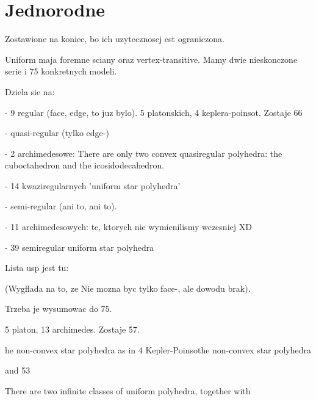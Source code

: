 \section{Jednorodne}
Zostawione na koniec, bo ich uzytecznoscj est ograniczona.

Uniform maja foremne sciany oraz vertex-transitive. Mamy dwie nieskonczone serie i 75 konkretnych modeli.

Dziela sie na:

- 9 regular (face, edge, to juz bylo). 5 platonskich, 4 keplera-poinsot. Zostaje 66

- quasi-regular (tylko edge-)

- 2 archimedesowe: There are only two convex quasiregular polyhedra: the cuboctahedron and the icosidodecahedron.

- 14 kwaziregularnych 'uniform star polyhedra'

- semi-regular (ani to, ani to).

- 11 archimedesowych: te, ktorych nie wymienilismy wczesniej XD

- 39 semiregular uniform star polyhedra

Lista usp jest tu: %

(Wygflada na to, ze Nie mozna byc tylko face-, ale dowodu brak).

Trzeba je wysumowac do 75.

5 platon, 13 archimedes. Zostaje 57.

he non-convex star polyhedra as in 4 Kepler-Poinsothe non-convex star polyhedra

and 53 %

There are two infinite classes of uniform polyhedra, together with %

